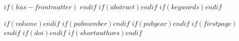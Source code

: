 $if(has-frontmatter)$
\frontmatter
$endif$
$if(abstract)$$endif$
$if(keywords)$$endif$
\maketitle
$if(volume)$$endif$
$if(pubnumber)$$endif$
$if(pubyear)$$endif$
$if(firstpage)$$endif$
$if(doi)$$endif$
$if(shortauthors)$$endif$